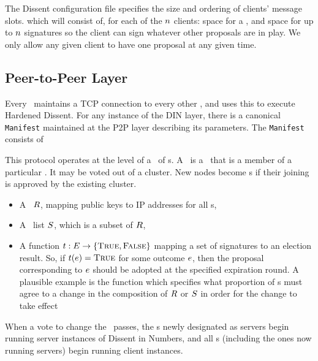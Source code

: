 The Dissent configuration file specifies the size and ordering of clients'
message slots. which will
consist of, for each of the $n$ clients: space for a \StructBallot, and space
for up to $n$ signatures so the client can sign whatever other proposals are in
play.  We only allow any given client to have one proposal at any given time.

\subsection{Peer-to-Peer Layer}
Every \KwMember~maintains a TCP connection to every other \KwMember,
and uses this to execute Hardened Dissent.
For any instance of the DIN layer, there is a canonical \texttt{Manifest}
maintained at the P2P layer describing its parameters. The \texttt{Manifest}
consists of

  This protocol operates at the level of a \KwCluster~of
    \KwNode s.  A \KwPeer~is a \KwNode~that is a member of a
    particular \KwCluster. It may be voted out of a cluster. New nodes
    become \KwPeer s if their joining is approved by the existing cluster.

\begin{itemize}
  \item A \KwRoster~$R$, mapping public keys to IP addresses for all
    \KwClient s,
  \item A \KwServer~list $S$, which is a subset of $R$,
  \item A function $t : E \to \{\textsc{True}, \textsc{False}\}$
    mapping a set of signatures to an election result. So, if
    $t(e) = \textsc{True}$ for some outcome $e$,
    then the proposal corresponding to $e$ should be adopted at the
    specified expiration round. A plausible example is the function which
    specifies what proportion of \KwMember s must agree to a change in the
    composition of $R$ or $S$ in order for the change to take
    effect
\end{itemize}

When a vote to change the \KwManifest~passes, the \KwMember s newly
designated as servers begin running server instances of Dissent in Numbers, and
all \KwMember s (including the ones now running servers) begin running
client instances.

